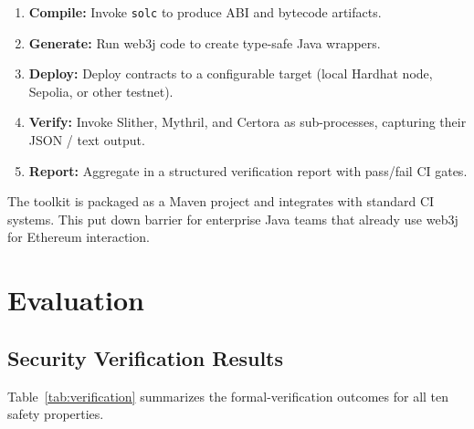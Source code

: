 \documentclass[conference]{IEEEtran}
\begin{document}
\begin{enumerate}
  \item \textbf{Compile:} Invoke \texttt{solc} to produce ABI and
        bytecode artifacts.
  \item \textbf{Generate:} Run web3j code to create
        type-safe Java wrappers.
  \item \textbf{Deploy:} Deploy contracts to a configurable target
        (local Hardhat node, Sepolia, or other testnet).
  \item \textbf{Verify:} Invoke Slither, Mythril, and Certora as
        sub-processes, capturing their JSON / text output.
  \item \textbf{Report:} Aggregate in a structured
        verification report with pass/fail CI gates.
\end{enumerate}

The toolkit is packaged as a Maven project and integrates with
standard CI systems.  This put down
barrier for enterprise Java teams that already use web3j for
Ethereum interaction.

\section{Evaluation}
\label{sec:evaluation}

\subsection{Security Verification Results}

Table~\ref{tab:verification} summarizes the formal-verification
outcomes for all ten safety properties.
\end{document}
